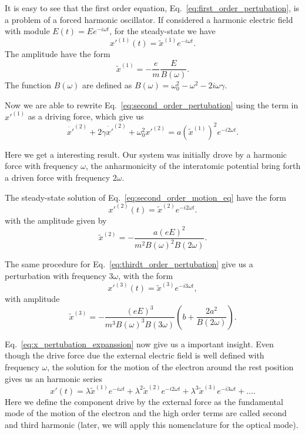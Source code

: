 It is easy to see that the first order equation, Eq.~\ref{eq:first_order_pertubation}, is a problem of a forced harmonic oscillator. If considered a harmonic electric field with module $E(t) = Ee^{-i\omega t}$, for the steady-state we have
\begin{equation}
    x'^{(1)}(t) = \tilde{x}^{(1)}e^{-i\omega t}.
\end{equation}
The amplitude have the form
\begin{equation}
    \tilde{x}^{(1)} = -\frac{e}{m}\frac{E}{B(\omega)}.
\end{equation}
The function $B(\omega)$ are defined as $B(\omega) = \omega_0^2-\omega^2-2i\omega\gamma$.

Now we are able to rewrite Eq.~\ref{eq:second_order_pertubation} using the term in $x'^{(1)}$ as a driving force, which give us
\begin{equation}
    \ddot{x'}^{(2)} + 2\gamma\dot{x'}^{(2)} + \omega_0^2x'^{(2)} = a\left(\tilde{x}^{(1)}\right)^2e^{-i2\omega t}.
    \label{eq:second_order_motion_eq}
\end{equation}

Here we get a interesting result. Our system was initially drove by a harmonic force with frequency $\omega$, the anharmonicity of the interatomic potential bring forth a driven force with frequency $2\omega$. 

The steady-state solution of Eq.~\ref{eq:second_order_motion_eq} have the form
\begin{equation}
    x'^{(2)}(t) = \tilde{x}^{(2)}e^{-i2\omega t}.
\end{equation}
with the amplitude given by
\begin{equation}
    \tilde{x}^{(2)} = -\frac{a\left(eE\right)^2}{m^2B(\omega)^2B(2\omega)}.
\end{equation}

The same procedure for Eq.~\ref{eq:thirdt_order_pertubation} give us a perturbation with frequency $3\omega$, with the form 
\begin{equation}
    x'^{(3)}(t) = \tilde{x}^{(3)}e^{-i3\omega t},
\end{equation}
with amplitude
\begin{equation}
    \tilde{x}^{(3)} = -\frac{\left(eE\right)^3}{m^3B(\omega)^3B(3\omega)}\left(b+\frac{2a ^2}{B(2\omega)}\right).
\end{equation}

Eq.~\ref{eq:x_pertubation_expanssion} now give us a important insight. Even though the drive force due the external electric field is well defined with frequency $\omega$, the solution for the motion of the electron around the rest position gives us an harmonic series
\begin{equation}
    x'(t) = \lambda \tilde{x}^{(1)}e^{-i\omega t} + \lambda^2 \tilde{x}^{(2)}e^{-i2\omega t} + \lambda^3 \tilde{x}^{(3)}e^{-i3\omega t} +....
\end{equation}
Here we define the component drive by the external force as the fundamental mode of the motion of the electron and the high order terms are called second and third harmonic (later, we will apply this nomenclature for the optical mode).%

